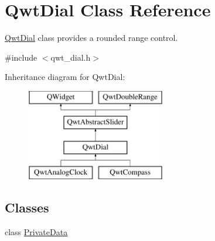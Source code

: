 \hypertarget{class_qwt_dial}{\section{Qwt\-Dial Class Reference}
\label{class_qwt_dial}
}


\hyperlink{class_qwt_dial}{Qwt\-Dial} class provides a rounded range control.  




{\ttfamily \#include $<$qwt\-\_\-dial.\-h$>$}

Inheritance diagram for Qwt\-Dial\-:\begin{figure}[H]
\begin{center}
\leavevmode
\includegraphics[height=4.000000cm]{class_qwt_dial}
\end{center}
\end{figure}
\subsection*{Classes}
\begin{DoxyCompactItemize}
\item 
class \hyperlink{class_qwt_dial_1_1_private_data}{Private\-Data}
\end{DoxyCompactItemize}
